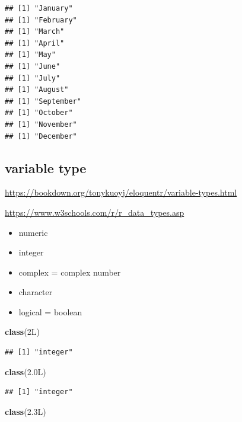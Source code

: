 \documentclass[
]{book}
\newenvironment{Shaded}{\begin{snugshade}}{\end{snugshade}}
\newcommand{\DataTypeTok}[1]{\textcolor[rgb]{0.13,0.29,0.53}{#1}}
\newcommand{\DecValTok}[1]{\textcolor[rgb]{0.00,0.00,0.81}{#1}}
\newcommand{\FloatTok}[1]{\textcolor[rgb]{0.00,0.00,0.81}{#1}}
\newcommand{\FunctionTok}[1]{\textcolor[rgb]{0.13,0.29,0.53}{\textbf{#1}}}
\newcommand{\NormalTok}[1]{#1}
\providecommand{\tightlist}{%
  \setlength{\itemsep}{0pt}\setlength{\parskip}{0pt}}
\theoremstyle{definition}
\theoremstyle{definition}
\theoremstyle{definition}
\theoremstyle{definition}
\theoremstyle{remark}
\begin{document}
\begin{verbatim}
## [1] "January"
## [1] "February"
## [1] "March"
## [1] "April"
## [1] "May"
## [1] "June"
## [1] "July"
## [1] "August"
## [1] "September"
## [1] "October"
## [1] "November"
## [1] "December"
\end{verbatim}

\subsection{variable type}\label{variable-type}

\url{https://bookdown.org/tonykuoyj/eloquentr/variable-types.html}

\url{https://www.w3schools.com/r/r_data_types.asp}

\begin{itemize}
\tightlist
\item
  numeric
\item
  integer
\item
  complex = complex number
\item
  character
\item
  logical = boolean
\end{itemize}

\begin{Shaded}
\begin{Highlighting}[]
\FunctionTok{class}\NormalTok{(}\DecValTok{2}\DataTypeTok{L}\NormalTok{)}
\end{Highlighting}
\end{Shaded}

\begin{verbatim}
## [1] "integer"
\end{verbatim}

\begin{Shaded}
\begin{Highlighting}[]
\FunctionTok{class}\NormalTok{(}\FloatTok{2.0}\NormalTok{L)}
\end{Highlighting}
\end{Shaded}

\begin{verbatim}
## [1] "integer"
\end{verbatim}

\begin{Shaded}
\begin{Highlighting}[]
\FunctionTok{class}\NormalTok{(}\FloatTok{2.3}\NormalTok{L)}
\end{Highlighting}
\end{Shaded}
\end{document}
